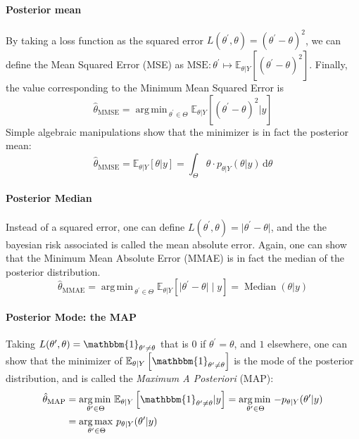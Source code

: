 \documentclass[a4paper,11pt]{article}
\newcommand{\Ex}{\mathbb{E}}
\newcommand{\estimtxt}[2]{\hat{#1}_{\mathrm{#2}}}
\DeclareMathOperator*{\argmin}{arg\,min \,}
\DeclareMathOperator*{\argmax}{arg\,max \,}
\theoremstyle{defi}
\numberwithin{thmCounter}{section}
\begin{document}
\paragraph{Posterior mean}
By taking a loss function as the squared error $L(\theta^{\prime}, \theta) = (\theta^{\prime} - \theta)^2$, we can define the Mean Squared Error (MSE) as $\mathrm{MSE}: \theta^{\prime}\mapsto\Ex_{\theta|Y}\left[(\theta^{\prime} - \theta)^2\right]$. Finally, the value corresponding to the Minimum Mean Squared Error is
\begin{equation}
  \estimtxt{\theta}{MMSE} = \argmin_{\theta^{\prime}\in\Theta}\Ex_{\theta|Y}\left[(\theta^{\prime} - \theta)^2 | y\right]
\end{equation}
Simple algebraic manipulations show that the minimizer is in fact the posterior mean:
\begin{equation*}
  \estimtxt{\theta}{MMSE} = \Ex_{\theta|Y}[\theta | y] = \int_{\Theta}\theta\cdot p_{\theta|Y}(\theta | y)\,\mathrm{d}\theta
\end{equation*}


\paragraph{Posterior Median}
Instead of a squared error, one can define $L(\theta^{\prime}, \theta) = \lvert\theta^{\prime} - \theta\rvert$, and the the bayesian risk associated is called the mean absolute error. Again, one can show that the Minimum Mean Absolute Error (MMAE) is in fact the median of the posterior distribution.
\begin{equation}
  \label{eq:def_MMAE}
  \estimtxt{\theta}{MMAE} = \argmin_{\theta^{\prime}\in\Theta}\Ex_{\theta|Y}\left[\lvert \theta^{\prime} - \theta \rvert \mid y\right] = \mathop{\mathrm{Median}}(\theta |y)
\end{equation}

\paragraph{Posterior Mode: the MAP}
Taking $L(\theta^{\prime},\theta) = \mathbbm{1}_{\theta^{\prime} \neq \theta}$ that is $0$ if $\theta^{\prime}=\theta$, and $1$ elsewhere, one can show that the minimizer of $\Ex_{\theta|Y}\left[\mathbbm{1}_{\theta^{\prime} \neq \theta}\right]$ is the mode of the posterior distribution, and is called the \emph{Maximum A Posteriori} (MAP):
\begin{align}
  \label{eq:def_MAP}
  \estimtxt{\theta}{MAP} &= \argmin_{\theta^{\prime} \in \Theta}\Ex_{\theta|Y}\left[\mathbbm{1}_{\theta^{\prime} \neq \theta}|y\right] = \argmin_{\theta^{\prime} \in \Theta} -p_{\theta|Y}(\theta^{\prime}|y) \\
                         &= \argmax_{\theta^{\prime} \in \Theta} p_{\theta|Y}(\theta^{\prime} |y)
                           \nonumber
\end{align}
\end{document}
